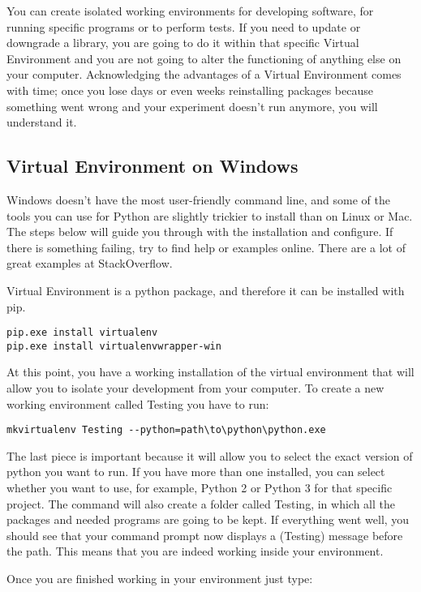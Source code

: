 You can create isolated working environments for developing software, for running specific programs or to perform tests. If you need to update or downgrade a library, you are going to do it within that specific Virtual Environment and you are not going to alter the functioning of anything else on your computer. Acknowledging the advantages of a Virtual Environment comes with time; once you lose days or even weeks reinstalling packages because something went wrong and your experiment doesn’t run anymore, you will understand it.

\subsection{Virtual Environment on Windows}
Windows doesn’t have the most user-friendly command line, and some of the tools you can use for Python are slightly trickier to install than on Linux or Mac. The steps below will guide you through with the installation and configure. If there is something failing, try to find help or examples online. There are a lot of great examples at StackOverflow.

Virtual Environment is a python package, and therefore it can be installed with pip.

\begin{verbatim}
pip.exe install virtualenv
pip.exe install virtualenvwrapper-win
\end{verbatim}

At this point, you have a working installation of the virtual environment that will allow you to isolate your development from your computer. To create a new working environment called Testing you have to run:

\begin{verbatim}
mkvirtualenv Testing --python=path\to\python\python.exe
\end{verbatim}

The last piece is important because it will allow you to select the exact version of python you want to run. If you have more than one installed, you can select whether you want to use, for example, Python 2 or Python 3 for that specific project. The command will also create a folder called Testing, in which all the packages and needed programs are going to be kept. If everything went well, you should see that your command prompt now displays a (Testing) message before the path. This means that you are indeed working inside your environment.

Once you are finished working in your environment just type:


